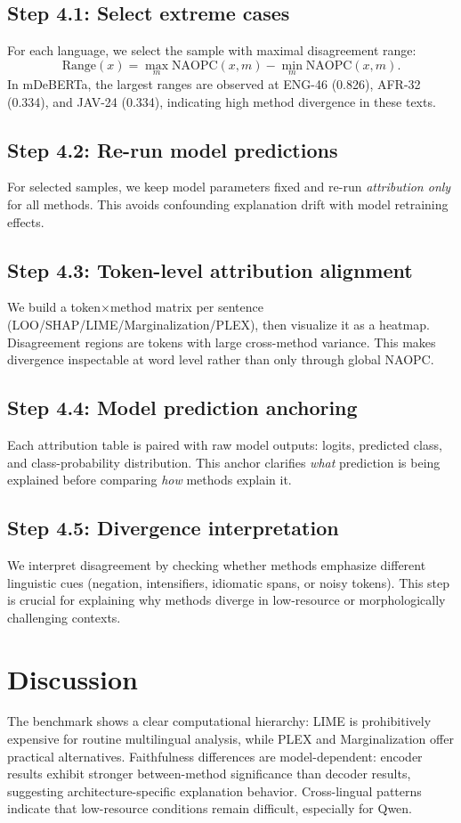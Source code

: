 \documentclass[11pt]{article}
\begin{document}
\subsection{Step 4.1: Select extreme cases}
For each language, we select the sample with maximal disagreement range:
\[
\mathrm{Range}(x)=\max_m \mathrm{NAOPC}(x,m)-\min_m \mathrm{NAOPC}(x,m).
\]
In mDeBERTa, the largest ranges are observed at ENG-46 (0.826), AFR-32 (0.334), and JAV-24 (0.334), indicating high method divergence in these texts.

\subsection{Step 4.2: Re-run model predictions}
For selected samples, we keep model parameters fixed and re-run \textit{attribution only} for all methods. This avoids confounding explanation drift with model retraining effects.

\subsection{Step 4.3: Token-level attribution alignment}
We build a token\(\times\)method matrix per sentence (LOO/SHAP/LIME/Marginalization/PLEX), then visualize it as a heatmap. Disagreement regions are tokens with large cross-method variance. This makes divergence inspectable at word level rather than only through global NAOPC.

\subsection{Step 4.4: Model prediction anchoring}
Each attribution table is paired with raw model outputs: logits, predicted class, and class-probability distribution. This anchor clarifies \textit{what} prediction is being explained before comparing \textit{how} methods explain it.

\subsection{Step 4.5: Divergence interpretation}
We interpret disagreement by checking whether methods emphasize different linguistic cues (negation, intensifiers, idiomatic spans, or noisy tokens). This step is crucial for explaining why methods diverge in low-resource or morphologically challenging contexts.

\section{Discussion}
The benchmark shows a clear computational hierarchy: LIME is prohibitively expensive for routine multilingual analysis, while PLEX and Marginalization offer practical alternatives. Faithfulness differences are model-dependent: encoder results exhibit stronger between-method significance than decoder results, suggesting architecture-specific explanation behavior. Cross-lingual patterns indicate that low-resource conditions remain difficult, especially for Qwen.
\end{document}
